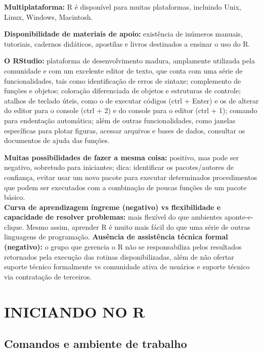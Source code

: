 \documentclass[
  11pt,
  a5paper,
  openany]{book}
\begin{document}
\textbf{Multiplataforma:} R é disponível para muitas plataformas, incluindo Unix, Linux, Windows, Macintosh.

\textbf{Disponibilidade de materiais de apoio:} existência de inúmeros manuais, tutoriais, cadernos didáticos, apostilas e livros destinados a ensinar o uso do R.

\textbf{O RStudio:} plataforma de desenvolvimento madura, amplamente utilizada pela comunidade e com um excelente editor de texto, que conta com uma série de funcionalidades, tais como identificação de erros de sintaxe; complemento de funções e objetos; coloração diferenciada de objetos e estruturas de controle; atalhos de teclado úteis, como o de executar códigos (ctrl + Enter) e os de alterar do editor para o console (ctrl + 2) e do console para o editor (ctrl + 1); comando para endentação automática; além de outras funcionalidades, como janelas específicas para plotar figuras, acessar arquivos e bases de dados, consultar os documentos de ajuda das funções.

\textbf{Muitas possibilidades de fazer a mesma coisa:} positivo, mas pode ser negativo, sobretudo para iniciantes; dica: identificar os pacotes/autores de confiança, evitar usar um novo pacote para executar determinados procedimentos que podem ser executados com a combinação de poucas funções de um pacote básico.\\
\textbf{Curva de aprendizagem íngreme (negativo) vs flexibilidade e capacidade de resolver problemas:} mais flexível do que ambientes aponte-e-clique. Mesmo assim, aprender R é muito mais fácil do que uma série de outras linguagens de programação.
\textbf{Ausência de assistência técnica formal (negativo):} o grupo que gerencia o R não se responsabiliza pelos resultados retornados pela execução das rotinas disponibilizadas, além de não ofertar suporte técnico formalmente vs comunidade ativa de usuários e suporte técnico via contratação de terceiros.

\hypertarget{iniciando-no-r}{%
\chapter{INICIANDO NO R}\label{iniciando-no-r}}

\hypertarget{comandos-e-ambiente-de-trabalho}{%
\section{Comandos e ambiente de trabalho}\label{comandos-e-ambiente-de-trabalho}}
\end{document}
